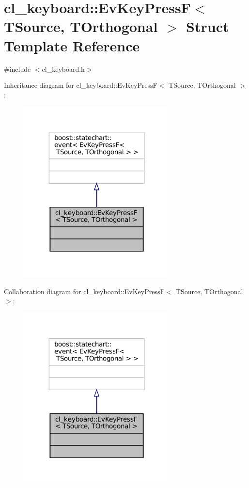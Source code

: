 \hypertarget{structcl__keyboard_1_1EvKeyPressF}{}\section{cl\+\_\+keyboard\+:\+:Ev\+Key\+PressF$<$ T\+Source, T\+Orthogonal $>$ Struct Template Reference}
\label{structcl__keyboard_1_1EvKeyPressF}


{\ttfamily \#include $<$cl\+\_\+keyboard.\+h$>$}



Inheritance diagram for cl\+\_\+keyboard\+:\+:Ev\+Key\+PressF$<$ T\+Source, T\+Orthogonal $>$\+:
\nopagebreak
\begin{figure}[H]
\begin{center}
\leavevmode
\includegraphics[width=227pt]{structcl__keyboard_1_1EvKeyPressF__inherit__graph}
\end{center}
\end{figure}


Collaboration diagram for cl\+\_\+keyboard\+:\+:Ev\+Key\+PressF$<$ T\+Source, T\+Orthogonal $>$\+:
\nopagebreak
\begin{figure}[H]
\begin{center}
\leavevmode
\includegraphics[width=227pt]{structcl__keyboard_1_1EvKeyPressF__coll__graph}
\end{center}
\end{figure}


